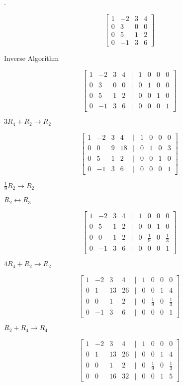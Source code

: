 \documentclass[a4paper,11pt,twoside]{report}
\begin{document}
.

\[\begin{bmatrix} 1 & -2 & 3 & 4 \\ 0 & 3 & 0 & 0 \\ 0 & 5 & 1 & 2 \\ 0 & -1 & 3 & 6 \end{bmatrix} \]

Inverse Algorithm

\[\begin{bmatrix} 1 & -2 & 3 & 4 & | & 1 & 0 & 0 & 0 \\ 0 & 3 & 0 & 0 & | & 0 & 1 & 0 & 0
\\ 0 & 5 & 1 & 2 & | & 0 & 0 & 1 & 0\\ 0 & -1 & 3 & 6 & | & 0 & 0 & 0 & 1\end{bmatrix} \]

$3R_4 + R_2 \to R_2$

\[\begin{bmatrix} 1 & -2 & 3 & 4 & | & 1 & 0 & 0 & 0 \\ 0 & 0 & 9 & 18 & | & 0 & 1 & 0 & 3
\\ 0 & 5 & 1 & 2 & | & 0 & 0 & 1 & 0\\ 0 & -1 & 3 & 6 & | & 0 & 0 & 0 & 1\end{bmatrix} \]

$\frac{1}{9}R_2 \to R_2$

$R_2 \leftrightarrow R_3$

\[\begin{bmatrix} 1 & -2 & 3 & 4 & | & 1 & 0 & 0 & 0 \\ 0 & 5 & 1 & 2 & | & 0 & 0 & 1 & 0\\
0 & 0 & 1 & 2 & | & 0 & \frac{1}{9} & 0 & \frac{1}{3} \\0 & -1 & 3 & 6 & | & 0 & 0 & 0 & 1\end{bmatrix} \]

$4R_4 + R_2 \to R_2$

\[\begin{bmatrix} 1 & -2 & 3 & 4 & | & 1 & 0 & 0 & 0 \\ 0 & 1 & 13 & 26 & | & 0 & 0 & 1 & 4\\
0 & 0 & 1 & 2 & | & 0 & \frac{1}{9} & 0 & \frac{1}{3} \\0 & -1 & 3 & 6 & | & 0 & 0 & 0 & 1\end{bmatrix} \]

$R_2 + R_4 \to R_4$

\[\begin{bmatrix} 1 & -2 & 3 & 4 & | & 1 & 0 & 0 & 0 \\ 0 & 1 & 13 & 26 & | & 0 & 0 & 1 & 4\\
0 & 0 & 1 & 2 & | & 0 & \frac{1}{9} & 0 & \frac{1}{3} \\0 & 0 & 16 & 32 & | & 0 & 0 & 1 & 5\end{bmatrix} \]
\end{document}
